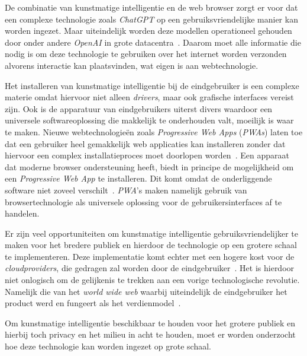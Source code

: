 \bigbreak{}

De combinatie van kunstmatige intelligentie en de web browser zorgt er voor dat een complexe technologie zoals \textit{ChatGPT} op een gebruiksvriendelijke manier kan worden ingezet. Maar uiteindelijk worden deze modellen operationeel gehouden door onder andere \textit{OpenAI} in grote datacentra~\autocite{Warren2023}. Daarom moet alle informatie die nodig is om deze technologie te gebruiken over het internet worden verzonden alvorens interactie kan plaatsvinden, wat eigen is aan webtechnologie.

\bigbreak{}

Het installeren van kunstmatige intelligentie bij de eindgebruiker is een complexe materie omdat hiervoor niet alleen \textit{drivers}, maar ook grafische interfaces vereist zijn. Ook is de apparatuur van eindgebruikers uiterst divers waardoor een universele softwareoplossing die makkelijk te onderhouden valt, moeilijk is waar te maken. Nieuwe webtechnologieën zoals \textit{Progressive Web Apps} (\textit{PWAs}) laten toe dat een gebruiker heel gemakkelijk web applicaties kan installeren zonder dat hiervoor een complex installatieproces moet doorlopen worden~\autocite{Pekala2023}. Een apparaat dat moderne browser ondersteuning heeft, biedt in principe de mogelijkheid om een \textit{Progressive Web App} te installeren. Dit komt omdat de onderliggende software niet zoveel verschilt~\autocite{Todavchich2019}. \textit{PWA}'s maken namelijk gebruik van  browsertechnologie als universele oplossing voor de gebruikersinterfaces af te handelen.

\bigbreak{}

Er zijn veel opportuniteiten om kunstmatige intelligentie gebruiksvriendelijker te maken voor het bredere publiek en hierdoor de technologie op een grotere schaal te implementeren. Deze implementatie komt echter met een hogere kost voor de \textit{cloudproviders}, die gedragen zal worden door de eind\-ge\-brui\-ker~\autocite{Khan2024}. Het is hierdoor niet onlogisch om de gelijkenis te trekken aan een vorige technologische revolutie. Namelijk die van het \textit{world wide web} waarbij uiteindelijk de eind\-ge\-brui\-ker het product werd en fungeert als het verdienmodel~\autocite{quoteresearch2017, OKO2019}.

\bigbreak{}

Om kunstmatige intelligentie beschikbaar te houden voor het grotere publiek en hierbij toch privacy en het milieu in acht te houden, moet er worden onderzocht hoe deze technologie kan worden ingezet op grote schaal.

